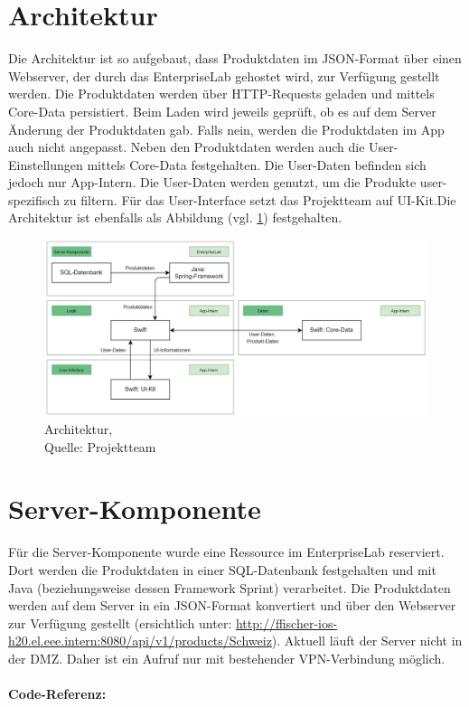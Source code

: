 \documentclass[12pt,titlepage]{article}
\begin{document}
\section*{Architektur}
Die Architektur ist so aufgebaut, dass Produktdaten im JSON-Format über einen Webserver, der durch das EnterpriseLab gehostet wird, zur Verfügung gestellt werden. Die Produktdaten werden über HTTP-Requests geladen und mittels Core-Data persistiert. Beim Laden wird jeweils geprüft, ob es auf dem Server Änderung der Produktdaten gab. Falls nein, werden die Produktdaten im App auch nicht angepasst. Neben den Produktdaten werden auch die User-Einstellungen mittels Core-Data festgehalten. Die User-Daten befinden sich jedoch nur App-Intern. Die User-Daten werden genutzt, um die Produkte user-spezifisch zu filtern. Für das User-Interface setzt das Projektteam auf UI-Kit.Die Architektur ist ebenfalls als Abbildung (vgl. \ref{img: Architektur}) festgehalten.\\
\begin{figure}[H]
	\centering
	\includegraphics[width=16cm]{Img/Architektur.png}
	\caption[Architektur]{Architektur,\\ Quelle: Projektteam}
	\label{img: Architektur}
\end{figure}

\section*{Server-Komponente}
Für die Server-Komponente wurde eine Ressource im EnterpriseLab reserviert. Dort werden die Produktdaten in einer SQL-Datenbank festgehalten und mit Java (beziehungsweise dessen Framework Sprint) verarbeitet. Die Produktdaten werden auf dem Server in ein JSON-Format konvertiert und über den Webserver zur Verfügung gestellt (ersichtlich unter: \url{http://ffischer-ios-h20.el.eee.intern:8080/api/v1/products/Schweiz}). Aktuell läuft der Server nicht in der DMZ. Daher ist ein Aufruf nur mit bestehender VPN-Verbindung möglich.\\
\\
\textbf{Code-Referenz: } 
\end{document}
